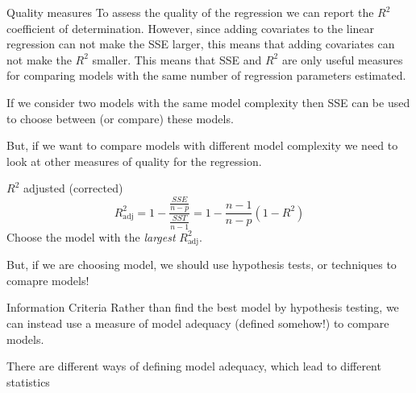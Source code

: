 \documentclass[
  ignorenonframetext,
]{beamer}
\begin{document}
\begin{frame}
\begin{block}{Quality measures}
\label{quality-measures}
To assess the quality of the regression we can report the \(R^2\)
coefficient of determination. However, since adding covariates to the
linear regression can not make the SSE larger, this means that adding
covariates can not make the \(R^2\) smaller. This means that SSE and
\(R^2\) are only useful measures for comparing models with the same
number of regression parameters estimated.

If we consider two models with the same model complexity then SSE can be
used to choose between (or compare) these models.

But, if we want to compare models with different model complexity we
need to look at other measures of quality for the regression.
\end{block}
\end{frame}

\begin{frame}
\begin{block}{\(R^2\) adjusted (corrected)}
\label{r2-adjusted-corrected}
\[R^2_{\text{adj}}=1-\frac{\frac{SSE}{n-p}}{\frac{SST}{n-1}}=1-\frac{n-1}{n-p}(1-R^2)\]
Choose the model with the \emph{largest} \(R^2_{\text{adj}}\).

But, if we are choosing model, we should use hypothesis tests, or
techniques to comapre models!
\end{block}
\end{frame}

\begin{frame}
\begin{block}{Information Criteria}
\label{information-criteria}
Rather than find the best model by hypothesis testing, we can instead
use a measure of model adequacy (defined somehow!) to compare models.

There are different ways of defining model adequacy, which lead to
different statistics
\end{block}
\end{frame}
\end{document}

